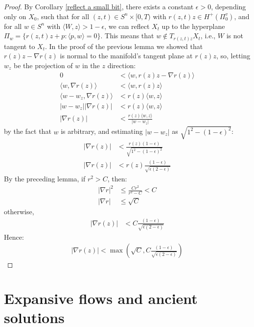 \begin{proof}
		By Corollary \ref{reflect a small bit}, there exists a constant $ \epsilon > 0 $, depending only on $ X_0 $, such that for all $ (z, t) \in S^n \times [0, T) $ with $ r(z, t) z \in H^+(\Pi_0^v) $, and for all $ w \in S^n $ with $ \langle W, z \rangle > 1 - \epsilon $, we can reflect $ X_t $ up to the hyperplane $ \Pi_w = \{r(z, t) z + p : \langle p , w\rangle=0 \}$. This means that $ w \notin T_{r(z,t) z} X_t $, i.e., $ W $ is not tangent to $ X_t $. In the proof of the previous lemma we showed that $r(z) z - \nabla r(z)$ is normal to the manifold's tangent plane at $r(z) z$, so, letting $w_z$ be the projection of $w$ in the $z$ direction: 
	\begin{align*}
		0&< \langle w, r(z) z - \nabla r(z)  \rangle\\
		\langle w,  \nabla r(z)  \rangle &< \langle w, r(z) z   \rangle\\
		\langle w - w_z,  \nabla r(z)  \rangle &< r(z) \langle w,  z   \rangle\\
		|w - w_z||\nabla r(z)|  &<  r(z) \langle w,  z   \rangle\\
		|\nabla r(z)| &<  \frac{r(z) \langle w,  z   \rangle}{|w - w_z|}
	\end{align*}
	by the fact that $w$ is arbitrary, and estimating $|w - w_z|$ as $\sqrt{1^2 - (1-\epsilon)^2}$:
	\begin{align*}
		|\nabla r(z)|  &<\frac{r(z) (1-\epsilon)}{\sqrt{1^2 - (1-\epsilon)^2}}\\
		|\nabla r(z)|  &<r(z)\frac{ (1-\epsilon)}{\sqrt{\epsilon (2-\epsilon)}}
	\end{align*}
	By the preceding lemma, if $ r^2 > C $, then:
	\begin{align*}
		|\nabla r|^2 &\leq \frac{C r^2}{r^2 - C} < C\\
		|\nabla r| &\leq \sqrt{C}
	\end{align*}
	otherwise, 
	\begin{align*}
		|\nabla r(z)|  &<C\frac{ (1-\epsilon)}{\sqrt{\epsilon (2-\epsilon)}}
	\end{align*}
	Hence:
	\begin{align*}
		|\nabla r(z)| < \max\left(\sqrt{C}, C\frac{ (1-\epsilon)}{\sqrt{\epsilon (2-\epsilon)}}\right)
	\end{align*} 
\end{proof}
\section{Expansive flows and ancient solutions}\label{SinestRisaResult}

